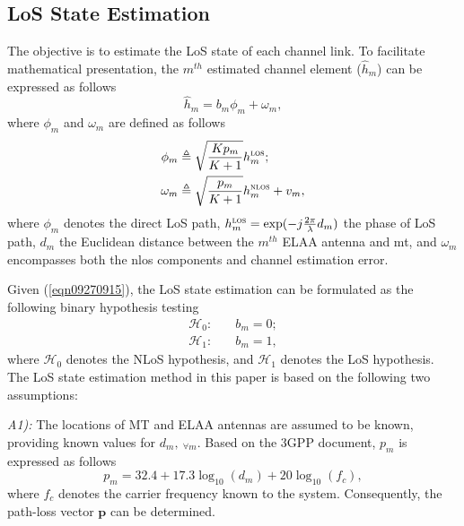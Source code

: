 \documentclass[conference, a4paper]{IEEEtran}
\renewcommand{\eqref}[1]{(\ref{#1})}
\begin{document}
\subsection{LoS State Estimation}
The objective is to estimate the LoS state of each channel link.
To facilitate mathematical presentation, the $m^{th}$ estimated channel element ($\hat{h}_{m}$) can be expressed as follows
\begin{equation} \label{eqn09270915}
	\hat{h}_{m} = b_{m} \phi_{m} + \omega_{m},
\end{equation}
where $\phi_{m}$ and $\omega_{m}$ are defined as follows
\begin{subequations}
	\begin{align}
		\phi_{m} &\triangleq \sqrt{\dfrac{Kp_{m}}{K + 1}} h_{m}^{\textsc{los}}; \label{eqn08220926} \\
		\omega_{m} &\triangleq \sqrt{\dfrac{p_m}{K + 1}}h_{m}^{\textsc{nlos}} + v_{m}, \label{eqn04560925}
	\end{align}
\end{subequations}
where $\phi_{m}$ denotes the direct LoS path, $h_{m}^{\textsc{los}} = \exp(-j\frac{2\pi}{\lambda}d_{m})$ the phase of LoS path, $d_{m}$ the Euclidean distance between the $m^{th}$ ELAA antenna and \gls{mt}, and $\omega_{m}$ encompasses both the \gls{nlos} components and channel estimation error.

Given \eqref{eqn09270915}, the LoS state estimation can be formulated as the following binary hypothesis testing
\begin{subequations}\label{eqn02060926}
	\begin{align}
		\mathcal{H}_{0}: \quad & b_{m} = 0; \label{eqn02060926a} \\
		\mathcal{H}_{1}: \quad & b_{m} = 1, \label{eqn02060926b}
	\end{align}
\end{subequations}
where $\mathcal{H}_{0}$ denotes the NLoS hypothesis, and $\mathcal{H}_{1}$ denotes the LoS hypothesis.
The LoS state estimation method in this paper is based on the following two assumptions:

\textit{A1):} The locations of MT and ELAA antennas are assumed to be known, providing known values for $d_{m}, ~_{\forall m}$.
Based on the 3GPP document, $p_m$ is expressed as follows \cite{3GPP2022}
\begin{equation}
	p_{m} = 32.4 + 17.3\log_{10}(d_{m}) + 20 \log_{10}(f_{c}),
\end{equation}
where $f_{c}$ denotes the carrier frequency known to the system.
Consequently, the path-loss vector $\mathbf{p}$ can be determined.
\end{document}
